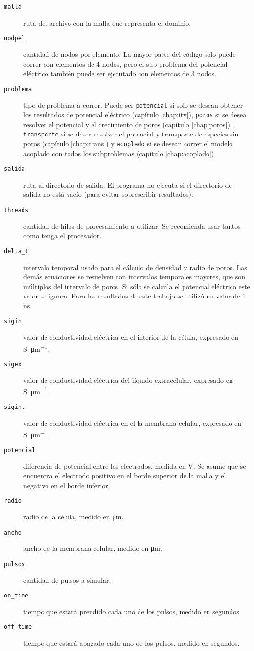 \begin{description}
	\item[\texttt{malla}] ruta del archivo con la malla que representa el dominio. 
	\item[\texttt{nodpel}] cantidad de nodos por elemento. La mayor parte del código solo puede correr con elementos de 4 nodos, pero el sub-problema del potencial eléctrico también puede ser ejecutado con elementos de 3 nodos.
	\item[\texttt{problema}] tipo de problema a correr. Puede ser \texttt{potencial} si solo se desean obtener los resultados de potencial eléctrico (capítulo \ref{chap:itv}), \texttt{poros} si se desea resolver el potencial y el crecimiento de poros (capítulo \ref{chap:poros}), \texttt{transporte} si se desea resolver el potencial y transporte de especies sin poros (capítulo \ref{chap:trans}) y \texttt{acoplado} si se desean correr el modelo acoplado con todos los subproblemas (capítulo \ref{chap:acoplado}).
	\item[\texttt{salida}] ruta al directorio de salida. El programa no ejecuta si el directorio de salida no está vacío (para evitar sobrescribir resultados).
	\item[\texttt{threads}] cantidad de hilos de procesamiento a utilizar. Se recomienda usar tantos como tenga el procesador.
	\item[\texttt{delta\_t}] intervalo temporal usado para el cálculo de densidad y radio de poros. Las demás ecuaciones se resuelven con intervalos temporales mayores, que son múltiplos del intervalo de poros. Si sólo se calcula el potencial eléctrico este valor se ignora. Para los resultados de este trabajo se utilizó un valor de 1 \si{\nano\second}.
	\item[\texttt{sigint}] valor de conductividad eléctrica en el interior de la célula, expresado en \si{\siemens \per \micro\metre}.
	\item[\texttt{sigext}] valor de conductividad eléctrica del líquido extracelular, expresado en \si{\siemens \per \micro\metre}.
	\item[\texttt{sigint}] valor de conductividad eléctrica en el la membrana celular, expresado en \si{\siemens \per \micro\metre}.
	\item[\texttt{potencial}] diferencia de potencial entre los electrodos, medida en \si{\volt}. Se asume que se encuentra el electrodo positivo en el borde superior de la malla y el negativo en el borde inferior.
	\item[\texttt{radio}] radio de la célula, medido en \si{\micro\metre}.
	\item[\texttt{ancho}] ancho de la membrana celular, medido en \si{\micro\metre}.
	\item[\texttt{pulsos}] cantidad de pulsos a simular.
	\item[\texttt{on\_time}] tiempo que estará prendido cada uno de los pulsos, medido en segundos.
	\item[\texttt{off\_time}] tiempo que estará apagado cada uno de los pulsos, medido en segundos. 
\end{description}

